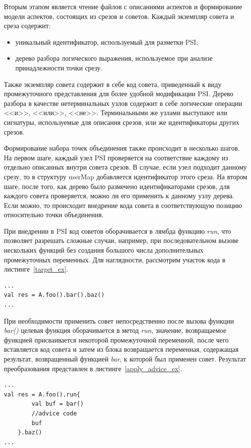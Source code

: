 \documentclass[conference]{IEEEtran}
\begin{document}
Вторым этапом является чтение файлов с описаниями аспектов и формирование
модели аспектов, состоящих из срезов и советов.
Каждый экземпляр совета и среза содержит:
\begin{itemize}
	\item уникальный идентификатор, используемый для разметки PSI;
	\item дерево разбора логического выражения, используемое при анализе
		  принадлежности точки срезу.
\end{itemize}
Также экземпляр совета содержит в себе код совета, приведенный к виду
промежуточного представления для более удобной модификации PSI.
Дерево разбора в качестве нетерминальных узлов содержит в себе логические
операции <<и>>, <<или>>, <<не>>.
Терминальными же узлами выступают или сигнатуры, используемые для описания
срезов, или же идентификаторы других срезов.

Формирование набора точек объединения также происходит в несколько шагов.
На первом шаге, каждый узел PSI проверяется на соответствие каждому из отдельно
описанных внутри совета срезов.
В случае, если узел подходит данному срезу, то в структуру userMap добавляется
идентификатор этого среза.
На втором шаге, после того, как дерево было размечено идентификаторами срезов, 
для каждого совета проверяется, можно ли его применить к данному узлу дерева.
Если можно, то происходит внедрение кода совета в соответствующую позицию
относительно точки объединения.

При внедрении в PSI код советов оборачивается в лямбда функцию \textit{run}, что
позволяет разрешать сложные случаи, например, при последовательном вызове
нескольких функций без создания большого числа дополнительных 
промежуточных переменных.
Для наглядности, рассмотрим участок кода в листинге~\ref{target_ex}.
\begin{lstlisting}[label=target_ex,
    caption={Пример целевой точки включения}]
...
val res = A.foo().bar().baz()
...
\end{lstlisting}
При необходимости применить совет непосредственно после вызова функции 
\textit{bar()} целевая функция оборачивается в метод \textit{run}, значение, 
возвращаемое функцией присваивается некоторой промежуточной переменной, после 
чего вставляется код совета и затем из блока возвращается переменная, 
содержащая результат, возвращенный функцией \textit{bar}, к которой был применен
совет.
Результат преобразования представлен в листинге~\ref{apply_advice_ex}.
\begin{lstlisting}[label=apply_advice_ex,
    caption={Пример внедрения кода с использованием функции run}]
...
val res = A.foo().run{
        val buf = bar()
        //advice code
        buf
    }.baz()
...
\end{lstlisting}
\end{document}
